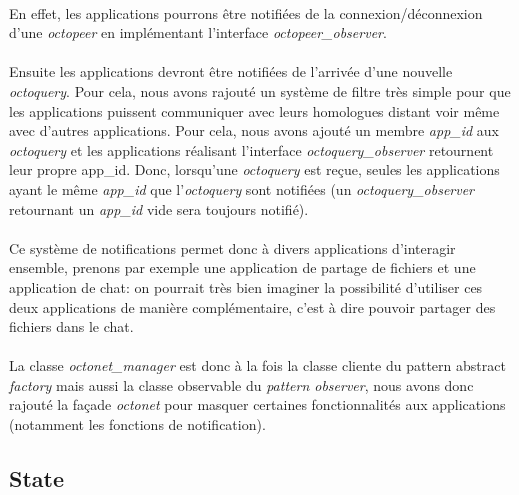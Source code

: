 \documentclass[a4paper]{article}
\begin{document}
			\paragraph{}{
			En effet, les applications pourrons être notifiées de la connexion/déconnexion d’une
			\textit{octopeer} en implémentant l’interface \textit{octopeer\_observer}.
			}
			\paragraph{}{
			Ensuite les applications devront être notifiées de l’arrivée d’une nouvelle \textit{octoquery}. 
			Pour cela, nous avons rajouté un système de filtre très simple pour que les applications 
			puissent communiquer avec leurs homologues distant voir même avec d’autres applications. \newline
			Pour cela, nous avons ajouté un membre \textit{app\_id} aux \textit{octoquery} et les applications réalisant 
			l’interface \textit{octoquery\_observer} retournent leur propre app\_id. Donc, lorsqu’une \textit{octoquery}
			est reçue, seules les applications ayant le même \textit{app\_id} que l’\textit{octoquery} sont notifiées 
			(un \textit{octoquery\_observer} retournant un \textit{app\_id} vide sera toujours notifié).
			}

			\paragraph{}{
			Ce système de notifications permet donc à divers applications d’interagir ensemble, prenons par 
			exemple une application de partage de fichiers et une application de chat: on pourrait très bien 
			imaginer la possibilité d’utiliser ces deux applications de manière complémentaire, c’est à dire 
			pouvoir partager des fichiers dans le chat.
			}
			
			\paragraph{}{
			La classe \textit{octonet\_manager} est donc à la fois la classe cliente du pattern abstract \textit{factory} 
			mais aussi la classe observable du \textit{pattern observer}, nous avons donc rajouté la façade 
			\textit{octonet} pour masquer certaines fonctionnalités aux applications (notamment les fonctions de notification).
			}
		
		\newpage 
		
		\subsection{State}
		
\end{document}

